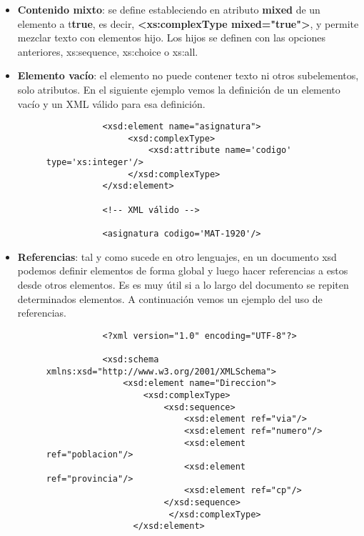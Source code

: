 \begin{itemize}
\begin{itemize}
\begin{itemize}
            \item \textbf{Contenido mixto}: se define estableciendo en atributo \textbf{mixed} de un elemento a t\textbf{true}, es decir, \textbf{<xs:complexType mixed="true">}, y permite mezclar texto con elementos hijo. Los hijos se definen con las opciones anteriores, xs:sequence, xs:choice o xs:all.

            \item \textbf{Elemento vacío}: el elemento no puede contener texto ni otros subelementos, solo atributos. En el siguiente ejemplo vemos la definición de un elemento vacío y un XML válido para esa definición.

             \begin{figure}[h]
                \begin{tcolorbox}[sharp corners, colback=yellow!30, colframe=white!20]
                    \scriptsize
                    \begin{verbatim}
           <xsd:element name="asignatura">
                <xsd:complexType>
                    <xsd:attribute name='codigo' type='xs:integer'/>
                </xsd:complexType>
           </xsd:element>

           <!-- XML válido -->

           <asignatura codigo='MAT-1920'/>
                    \end{verbatim}
                \end{tcolorbox}
            \end{figure}

        \item \textbf{Referencias}: tal y como sucede en otro lenguajes, en un documento xsd podemos definir elementos de forma global y luego hacer referencias a estos desde otros elementos. Es es muy útil si a lo largo del documento se repiten determinados elementos. A continuación vemos un ejemplo del uso de referencias.

        \begin{figure}[h]
            \begin{tcolorbox}[sharp corners, colback=yellow!30, colframe=white!20]
                \scriptsize
                \begin{verbatim}
           <?xml version="1.0" encoding="UTF-8"?>

           <xsd:schema xmlns:xsd="http://www.w3.org/2001/XMLSchema">
               <xsd:element name="Direccion">
                   <xsd:complexType>
                       <xsd:sequence>
                           <xsd:element ref="via"/>
                           <xsd:element ref="numero"/>
                           <xsd:element ref="poblacion"/>
                           <xsd:element ref="provincia"/>
                           <xsd:element ref="cp"/>
                       </xsd:sequence>
                        </xsd:complexType>
                 </xsd:element>


\end{verbatim}
\end{tcolorbox}
\end{figure}
\end{itemize}
\end{itemize}
\end{itemize}

